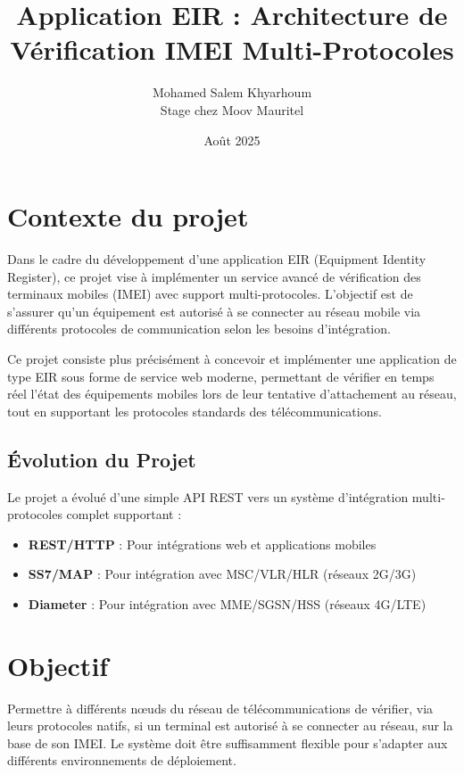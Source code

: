 \documentclass[11pt]{article}
\title{Application EIR : Architecture de Vérification IMEI Multi-Protocoles}
\author{Mohamed Salem Khyarhoum \\ Stage chez Moov Mauritel}
\date{Août 2025}
\begin{document}
\maketitle

\tableofcontents
\newpage

\section{Contexte du projet}

Dans le cadre du développement d'une application EIR (Equipment Identity Register), ce projet vise à implémenter un service avancé de vérification des terminaux mobiles (IMEI) avec support multi-protocoles. L'objectif est de s'assurer qu'un équipement est autorisé à se connecter au réseau mobile via différents protocoles de communication selon les besoins d'intégration.

Ce projet consiste plus précisément à concevoir et implémenter une application de type EIR sous forme de service web moderne, permettant de vérifier en temps réel l'état des équipements mobiles lors de leur tentative d'attachement au réseau, tout en supportant les protocoles standards des télécommunications.

\subsection{Évolution du Projet}

Le projet a évolué d'une simple API REST vers un système d'intégration multi-protocoles complet supportant :
\begin{itemize}
    \item \textbf{REST/HTTP} : Pour intégrations web et applications mobiles
    \item \textbf{SS7/MAP} : Pour intégration avec MSC/VLR/HLR (réseaux 2G/3G)
    \item \textbf{Diameter} : Pour intégration avec MME/SGSN/HSS (réseaux 4G/LTE)
\end{itemize}

\section{Objectif}

Permettre à différents nœuds du réseau de télécommunications de vérifier, via leurs protocoles natifs, si un terminal est autorisé à se connecter au réseau, sur la base de son IMEI. Le système doit être suffisamment flexible pour s'adapter aux différents environnements de déploiement.
\end{document}
